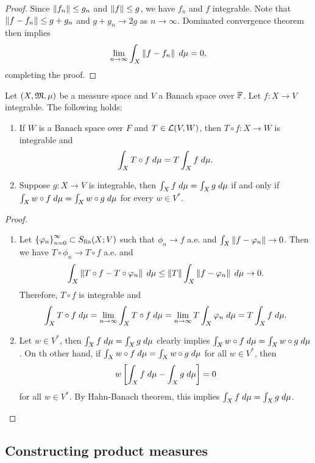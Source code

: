 \documentclass[a4paper]{article}
\begin{document}
\begin{proof}
Since $\left\lVert f_n\right\rVert \leq g_n$ and $\left\lVert f\right\rVert \leq g$, 
we have $f_n$ and $f$ integrable. Note that 
$\left\lVert f - f_n\right\rVert \leq g + g_n$ and $g + g_n \to 2g$ 
as $n \to \infty$. Dominated convergence theorem then implies 
\[
\lim_{n \to \infty} \int_X \left\lVert f - f_n\right\rVert \; d \mu = 0,
\]
completing the proof.
\end{proof}

\begin{prop}
Let $(X, \mathfrak{M}, \mu)$ be a measure space and $V$ a Banach 
space over $\mathbb{F}$. 
Let $f : X \to V$ integrable. The following holds: 
\begin{enumerate}
\item If $W$ is a Banach space over $F$ and $T \in \mathcal{L}(V, W)$,
then $T \circ f: X \to W$ is integrable and 
\[
\int_X T \circ f \; d \mu = T \int_X f \; d \mu.
\]

\item Suppose $g : X \to V$ is integrable, then 
$\int_X f \; d \mu = \int_X g \; d \mu$ if and only if 
$\int_X w \circ f \; d \mu = \int_X w \circ g \; d \mu$ 
for every $w \in V^*$.
\end{enumerate}
\end{prop}

\begin{proof}
\begin{enumerate}
\item Let $\left\{ \varphi_n \right\}_{n=0}^\infty \subset S_{\text{fin}}(X ; V)$ such that 
$\phi_n \to f$ a.e. and $\int_X \left\lVert f - \varphi_n\right\rVert \to 0$.
Then we have $T \circ \phi_n \to T \circ f$ a.e. and 
\[
\int_X \left\lVert T \circ f - T \circ \varphi_n\right\rVert \; d \mu
\leq \left\lVert T\right\rVert \int_X \left\lVert f - \varphi_n\right\rVert \; d \mu \to 0.
\]
Therefore, $T \circ f$ is integrable and 
\[
\int_X T \circ f \; d \mu = \lim_{n \to \infty}
\int_X T \circ f \; d \mu
= \lim_{n \to \infty} T \int_X \varphi_n \; d \mu
= T \int_X f \; d \mu.
\]

\item Let $w \in V^*$, then $\int_X f \; d \mu = \int_X g \; d \mu$
clearly implies $\int_X w \circ f \; d \mu = \int_X w \circ g 
\; d \mu$. On th other hand, if $\int_X w \circ f \; d \mu = \int_X 
w \circ g \; d \mu$ for all $w \in V^*$, then 
\[
w \left[ \int_X f \; d \mu - \int_X g \; d \mu \right] = 0
\]
for all $w \in V^*$. By Hahn-Banach theorem, 
this implies $\int_X f \; d \mu = \int_X g \; d \mu$.
\end{enumerate}
\end{proof}

\subsection{Constructing product measures}
\end{document}
